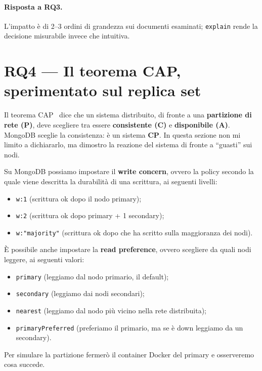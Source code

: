 \documentclass{article}
\begin{document}
\paragraph{Risposta a RQ3.} L'impatto è di 2--3 ordini di grandezza sui documenti
esaminati; \texttt{explain} rende la decisione misurabile invece che intuitiva.

\section{RQ4 --- Il teorema CAP, sperimentato sul replica set}
\label{sec:rq4}

Il teorema CAP~\cite{GilbertLynch2002,Brewer2012CAP} dice che un sistema
distribuito, di fronte a una \textbf{partizione di rete (P)}, deve scegliere tra
essere \textbf{consistente (C)} e \textbf{disponibile (A)}. MongoDB sceglie la
consistenza: è un sistema \textbf{CP}. In questa sezione non mi limito a
dichiararlo, ma dimostro la reazione del sistema di fronte a ``guasti'' sui nodi.

Su MongoDB possiamo impostare il \textbf{write concern}, ovvero la policy secondo
la quale viene descritta la durabilità di una scrittura, ai seguenti livelli:
\begin{itemize}
    \item \texttt{w:1} (scrittura ok dopo il nodo primary);
    \item \texttt{w:2} (scrittura ok dopo primary + 1 secondary);
    \item \texttt{w:"majority"} (scrittura ok dopo che ha scritto sulla
    maggioranza dei nodi).
\end{itemize}
È possibile anche impostare la \textbf{read preference}, ovvero scegliere da quali
nodi leggere, ai seguenti valori:
\begin{itemize}
    \item \texttt{primary} (leggiamo dal nodo primario, il default);
    \item \texttt{secondary} (leggiamo dai nodi secondari);
    \item \texttt{nearest} (leggiamo dal nodo più vicino nella rete distribuita);
    \item \texttt{primaryPreferred} (preferiamo il primario, ma se è down leggiamo
    da un secondary).
\end{itemize}
Per simulare la partizione fermerò il container Docker del primary e osserveremo
cosa succede.
\end{document}
